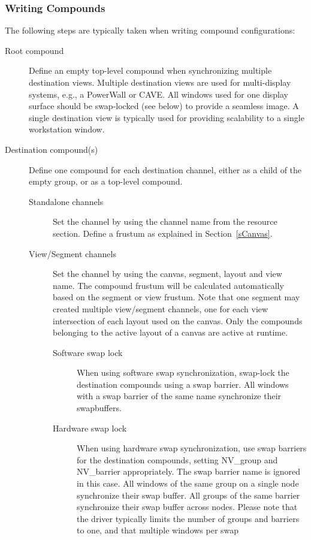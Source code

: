 \documentclass[10pt,a4]{scrartcl}
\newcommand{\sref}[1]{Section~\ref{#1}}
\begin{document}
\subsubsection{Writing Compounds}
The following steps are typically taken when writing compound
configurations:
\begin{description}
\item [Root compound] Define an empty top-level compound when
  synchronizing multiple destination views. Multiple destination views
  are used for multi-display systems, e.g., a PowerWall or CAVE. All
  windows used for one display surface should be swap-locked (see below)
  to provide a seamless image. A single destination view is typically
  used for providing scalability to a single workstation window.
\item [Destination compound(s)] Define one compound for each destination
  channel, either as a child of the empty group, or as a top-level
  compound.
  \begin{description}
  \item[Standalone channels] Set the channel by using the channel name
    from the resource section. Define a frustum as explained in
    \sref{sCanvas}.
  \item[View/Segment channels] Set the channel by using the canvas, segment,
    layout and view name. The compound frustum will be calculated automatically
    based on the segment or view frustum. Note that one segment may created
    multiple view/segment channels, one for each view intersection of each
    layout used on the canvas. Only the compounds belonging to the active layout
    of a canvas are active at runtime.
    \begin{description}
    \item [Software swap lock] When using software swap synchronization,
      swap-lock the destination compounds using a swap barrier. All
      windows with a swap barrier of the same name synchronize their
      swapbuffers.
    \item [Hardware swap lock] When using hardware swap synchronization,
      use swap barriers for the destination compounds, setting
      \textsf{NV\_group} and \textsf{NV\_barrier} appropriately. The
      swap barrier name is ignored in this case. All windows of the same
      group on a single node synchronize their swap buffer. All groups
      of the same barrier synchronize their swap buffer across
      nodes. Please note that the driver typically limits the number of
      groups and barriers to one, and that multiple windows per swap

\end{description}
\end{description}
\end{description}
\end{document}
